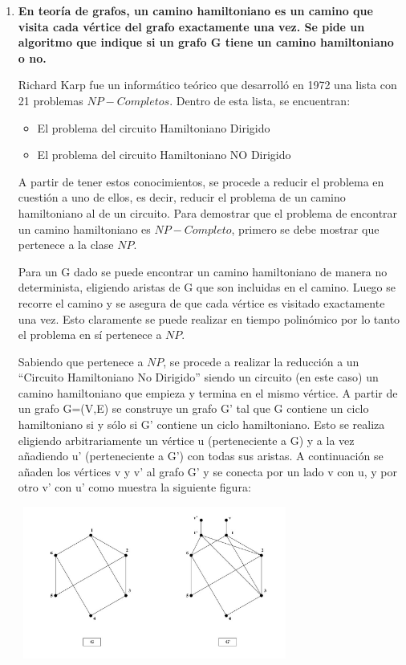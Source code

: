 \documentclass{article}
\newcommand\tab[1][0.5cm]{\hspace*{#1}}
\begin{document}
\begin{enumerate}
        \item \textbf{En teoría de grafos, un camino hamiltoniano es un camino que visita cada vértice del grafo exactamente
            una vez. Se pide un algoritmo que indique si un grafo G tiene un camino hamiltoniano o no.} %

            \tab Richard Karp fue un informático teórico que desarrolló en 1972 una lista con 21 problemas $NP-Completos$.
            Dentro de esta lista, se encuentran:
            \begin{itemize}
              \item El problema del circuito Hamiltoniano Dirigido
              \item El problema del circuito Hamiltoniano NO Dirigido
            \end{itemize}

            \tab A partir de tener estos conocimientos, se procede a reducir el problema en cuestión a uno de ellos, es decir,
             reducir el problema de un camino hamiltoniano al de un circuito. Para demostrar que el problema de encontrar un
             camino hamiltoniano es $NP-Completo$, primero se debe mostrar que pertenece a la clase $NP$.

             \tab Para un G dado se puede encontrar un camino hamiltoniano de manera no determinista, eligiendo aristas de G que son
             incluidas en el camino. Luego se recorre el camino y se asegura de que cada vértice es visitado exactamente una vez.
             Esto claramente se puede realizar en tiempo polinómico por lo tanto el problema en sí pertenece a $NP$.

             \tab Sabiendo que pertenece a $NP$, se procede a realizar la reducción a un “Circuito Hamiltoniano No Dirigido” siendo un
             circuito (en este caso) un camino hamiltoniano que empieza y termina en el mismo vértice. A partir de un grafo
             G=(V,E) se construye un grafo G’ tal que G contiene un ciclo hamiltoniano si y sólo si  G’ contiene un ciclo hamiltoniano.
             Esto se realiza eligiendo arbitrariamente un vértice u (perteneciente a G) y a la vez añadiendo u’ (perteneciente a G’)
             con todas sus aristas. A continuación se añaden los vértices v y v’ al grafo G’ y se conecta por un lado v con u, y por otro v’
             con u’ como muestra la siguiente figura:

             \begin{center}
                 \includegraphics[width=9cm, height=5cm]{images/p3}
             \end{center}


\end{enumerate}
\end{document}
